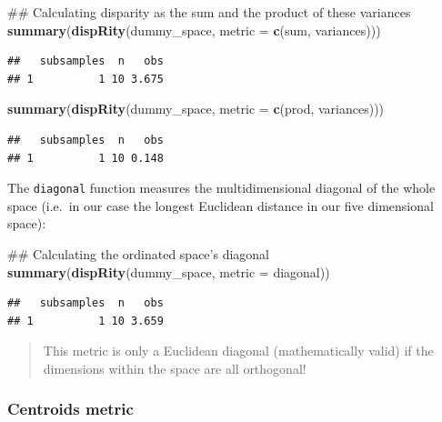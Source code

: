 \documentclass[]{book}
\newenvironment{Shaded}{\begin{snugshade}}{\end{snugshade}}
\newcommand{\KeywordTok}[1]{\textcolor[rgb]{0.13,0.29,0.53}{\textbf{#1}}}
\newcommand{\DataTypeTok}[1]{\textcolor[rgb]{0.13,0.29,0.53}{#1}}
\newcommand{\NormalTok}[1]{#1}
\theoremstyle{definition}
\theoremstyle{definition}
\theoremstyle{remark}
\begin{document}
\begin{Shaded}
\begin{Highlighting}[]
\NormalTok{## Calculating disparity as the sum and the product of these variances}
\KeywordTok{summary}\NormalTok{(}\KeywordTok{dispRity}\NormalTok{(dummy_space, }\DataTypeTok{metric =} \KeywordTok{c}\NormalTok{(sum, variances)))}
\end{Highlighting}
\end{Shaded}

\begin{verbatim}
##   subsamples  n   obs
## 1          1 10 3.675
\end{verbatim}

\begin{Shaded}
\begin{Highlighting}[]
\KeywordTok{summary}\NormalTok{(}\KeywordTok{dispRity}\NormalTok{(dummy_space, }\DataTypeTok{metric =} \KeywordTok{c}\NormalTok{(prod, variances)))}
\end{Highlighting}
\end{Shaded}

\begin{verbatim}
##   subsamples  n   obs
## 1          1 10 0.148
\end{verbatim}

The \texttt{diagonal} function measures the multidimensional diagonal of
the whole space (i.e.~in our case the longest Euclidean distance in our
five dimensional space):

\begin{Shaded}
\begin{Highlighting}[]
\NormalTok{## Calculating the ordinated space's diagonal}
\KeywordTok{summary}\NormalTok{(}\KeywordTok{dispRity}\NormalTok{(dummy_space, }\DataTypeTok{metric =}\NormalTok{ diagonal))}
\end{Highlighting}
\end{Shaded}

\begin{verbatim}
##   subsamples  n   obs
## 1          1 10 3.659
\end{verbatim}

\begin{quote}
This metric is only a Euclidean diagonal (mathematically valid) if the
dimensions within the space are all orthogonal!
\end{quote}

\subsubsection{Centroids metric}\label{centroids-metric}
\end{document}

